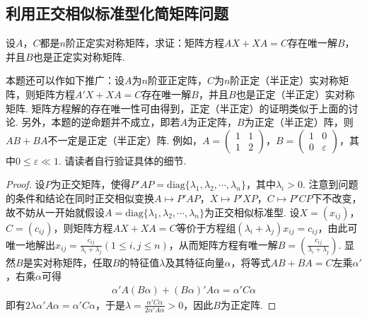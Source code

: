 \documentclass[../../main.tex]{subfiles}%
\begin{document}
\subsection{利用正交相似标准型化简矩阵问题}

\begin{proposition}\label{proposition:例9.69}
设\(A\)，\(C\)都是\(n\)阶正定实对称矩阵，求证：矩阵方程\(AX + XA = C\)存在唯一解\(B\)，并且\(B\)也是正定实对称矩阵.
\end{proposition}
\begin{remark}
本题还可以作如下推广：设\(A\)为\(n\)阶亚正定阵，\(C\)为\(n\)阶正定（半正定）实对称矩阵，则矩阵方程\(A'X + XA = C\)存在唯一解\(B\)，并且\(B\)也是正定（半正定）实对称矩阵. 矩阵方程解的存在唯一性可由得到，正定（半正定）的证明类似于上面的讨论. 另外，本题的逆命题并不成立，即若\(A\)为正定阵，\(B\)为正定（半正定）阵，则\(AB + BA\)不一定是正定（半正定）阵. 例如，\(A=\begin{pmatrix}1&1\\1&2\end{pmatrix}\)，\(B=\begin{pmatrix}1&0\\0&\varepsilon\end{pmatrix}\)，其中\(0\leqslant \varepsilon\ll1\). 请读者自行验证具体的细节.
\end{remark}
\begin{proof}
设\(P\)为正交矩阵，使得\(P'AP=\mathrm{diag}\{\lambda_1,\lambda_2,\cdots,\lambda_n\}\)，其中\(\lambda_i > 0\). 注意到问题的条件和结论在同时正交相似变换\(A\mapsto P'AP\)，\(X\mapsto P'XP\)，\(C\mapsto P'CP\)下不改变，故不妨从一开始就假设\(A = \mathrm{diag}\{\lambda_1,\lambda_2,\cdots,\lambda_n\}\)为正交相似标准型. 设\(X=(x_{ij})\)，\(C=(c_{ij})\)，则矩阵方程\(AX + XA = C\)等价于方程组\((\lambda_i + \lambda_j)x_{ij}=c_{ij}\)，由此可唯一地解出\(x_{ij}=\frac{c_{ij}}{\lambda_i + \lambda_j}(1\leqslant  i,j\leqslant  n)\)，从而矩阵方程有唯一解\(B = (\frac{c_{ij}}{\lambda_i + \lambda_j})\). 显然\(B\)是实对称矩阵，任取\(B\)的特征值\(\lambda\)及其特征向量\(\alpha\)，将等式\(AB + BA = C\)左乘\(\alpha'\)，右乘\(\alpha\)可得
\begin{align*}
\alpha'A(B\alpha)+(B\alpha)'A\alpha=\alpha'C\alpha
\end{align*}
即有\(2\lambda\alpha'A\alpha=\alpha'C\alpha\)，于是\(\lambda=\frac{\alpha'C\alpha}{2\alpha'A\alpha}>0\)，因此\(B\)为正定阵.
\end{proof}
\end{document}
